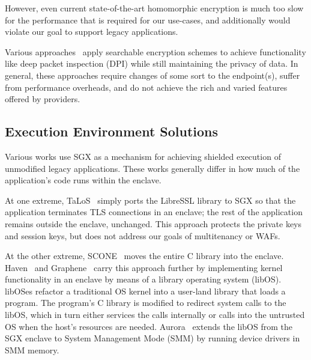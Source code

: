 However, even current state-of-the-art homomorphic encryption is much too slow
for the performance that is required for our use-cases, and additionally would
violate our goal to support legacy applications.


Various approaches~\cite{desmoulins2018pattern,
sherry2015blindbox, canard2017blindids,lan2016embark} apply searchable
encryption schemes to achieve functionality like deep packet inspection (DPI)
while still maintaining the privacy of data.
%
In general, these approaches require changes of some sort to the endpoint(s),
suffer from performance overheads, and do not achieve the rich and varied
features offered by providers.


\subsection{Execution Environment Solutions}

%
Various works use SGX as a mechanism for achieving shielded execution of
unmodified legacy applications.
%
These works generally differ in how much of the application's code runs
within the enclave.


At one extreme, TaLoS~\cite{talos} simply ports the LibreSSL library to SGX so
that the application terminates TLS connections in an enclave; the rest of
the application remains outside the enclave, unchanged.
%
This approach protects the private keys and session
keys, but does not address our goals of multitenancy or WAFs.


At the other extreme, SCONE~\cite{scone} moves the entire C library into the enclave.
%
Haven~\cite{haven} and Graphene~\cite{graphene} carry this approach further by
implementing kernel functionality in an enclave by means of a library operating
system (libOS).
libOSes refactor a traditional OS kernel into a user-land library that loads a
program.
%
The program's C library is modified to redirect system calls to the libOS, which
in turn either services the calls internally or calls into the untrusted OS
when the host's resources are needed.
%
Aurora~\cite{liang2018aurora} extends the libOS from the SGX enclave to System
Management Mode (SMM) by running device drivers in SMM memory.


